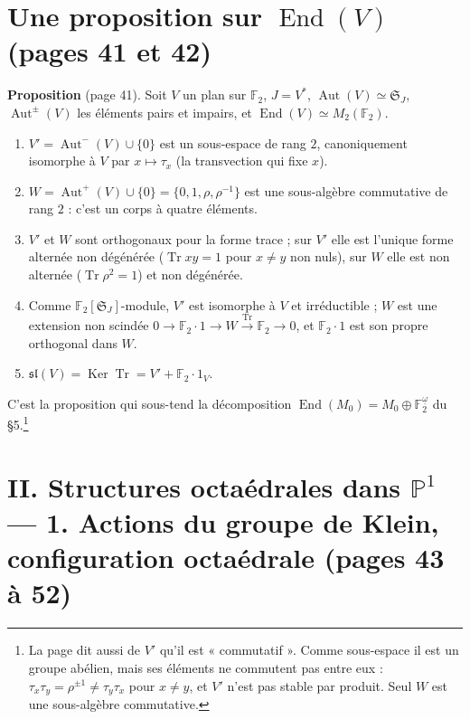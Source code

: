 \documentclass[11pt,a4paper]{article}
\begin{document}
\section*{Une proposition sur $\operatorname{End}(V)$ (pages 41 et 42)}

\textbf{Proposition} (page 41). Soit $V$ un plan sur $\mathbb{F}_2$, $J = V^{*}$,
$\operatorname{Aut}(V) \simeq \mathfrak{S}_J$, $\operatorname{Aut}^{\pm}(V)$ les
éléments pairs et impairs, et $\operatorname{End}(V) \simeq M_2(\mathbb{F}_2)$.
\begin{enumerate}
\item[1)] $V' = \operatorname{Aut}^{-}(V) \cup \{0\}$ est un sous-espace de rang
$2$, canoniquement isomorphe à $V$ par $x \mapsto \tau_x$ (la transvection qui
fixe $x$).
\item[2)] $W = \operatorname{Aut}^{+}(V) \cup \{0\} = \{0, 1, \rho, \rho^{-1}\}$
est une sous-algèbre commutative de rang $2$ : c'est un corps à quatre
éléments.
\item[3)] $V'$ et $W$ sont orthogonaux pour la forme trace ; sur $V'$ elle est
l'unique forme alternée non dégénérée ($\operatorname{Tr} xy = 1$ pour $x \neq
y$ non nuls), sur $W$ elle est non alternée ($\operatorname{Tr} \rho^2 = 1$) et
non dégénérée.
\item[4)] Comme $\mathbb{F}_2[\mathfrak{S}_J]$-module, $V'$ est isomorphe à $V$
et irréductible ; $W$ est une extension non scindée $0 \to \mathbb{F}_2 \cdot 1
\to W \xrightarrow{\operatorname{Tr}} \mathbb{F}_2 \to 0$, et $\mathbb{F}_2
\cdot 1$ est son propre orthogonal dans $W$.
\item[5)] $\mathfrak{sl}(V) = \operatorname{Ker} \operatorname{Tr} = V' +
\mathbb{F}_2 \cdot 1_V$.
\end{enumerate}
C'est la proposition qui sous-tend la décomposition $\operatorname{End}(M_0) =
M_0 \oplus \mathbb{F}_2^{\underline{\omega}}$ du §5.\footnote{La page dit aussi
de $V'$ qu'il est « commutatif ». Comme sous-espace il est un groupe abélien,
mais ses éléments ne commutent pas entre eux :
$\tau_x \tau_y = \rho^{\pm 1} \neq \tau_y \tau_x$ pour $x \neq y$, et $V'$ n'est
pas stable par produit. Seul $W$ est une sous-algèbre commutative.}

\section*{II. Structures octaédrales dans $\mathbb{P}^1$ --- 1. Actions du groupe de Klein, configuration octaédrale (pages 43 à 52)}
\end{document}
